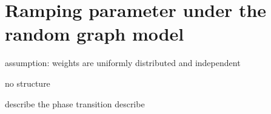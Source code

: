\chapter{Ramping parameter under the random graph model} %
\label{cha:ramping_parameter_under_the_random_graph_model}


assumption:
weights are uniformly distributed and independent

no structure


describe the phase transition
describe 


